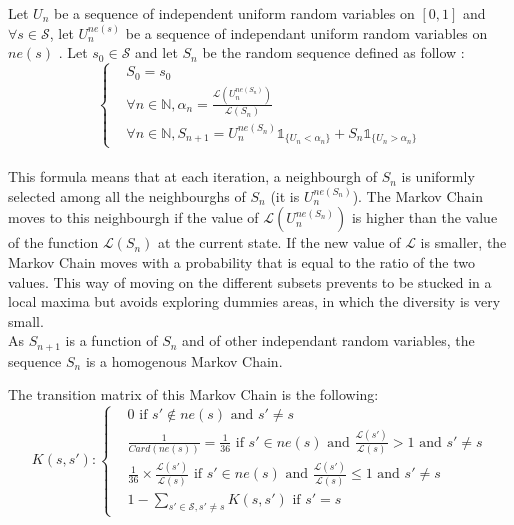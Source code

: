 Let $U_n$ be a sequence of independent uniform random variables on $[0, 1]$ and $\forall s \in \mathcal{S}$, let $U_{n}^{ne(s)}$ be a sequence of independant uniform random variables on $ne(s)$ .
Let $s_0 \in \mathcal{S}$ and let  $S_n$ be the random sequence defined as follow : \\


\[
 \left\{
    \begin{aligned}
        & S_0 = s_0 \\
        & \forall n \in \mathbb{N}, \alpha_n = \frac{\mathcal{L}(U_{n}^{ne(S_n)})}{\mathcal{L}(S_n)} \\
        & \forall n \in \mathbb{N}, S_{n+1} = U_{n}^{ne(S_n)} \mathbb{1}_{\{U_n < \alpha_n\}} + S_n \mathbb{1}_{\{U_n > \alpha_n\}}
\end{aligned}
\right.
\]
\\[0.5cm]

This formula means that at each iteration, a neighbourgh of $S_n$ is uniformly selected among all the neighbourghs of $S_n$ (it is $U_n^{ne(S_n)}$). 
The Markov Chain moves to this neighbourgh if the value of  $\mathcal{L}(U_n^{ne(S_n)})$ is higher than the value of the function $\mathcal{L}(S_n)$ at the current state.
If the new value of $\mathcal{L}$ is smaller, the Markov Chain moves with a probability that is equal to the ratio of the two values.
This way of moving on the different subsets prevents to be stucked in a local maxima but avoids exploring dummies areas, in which the diversity is very small. \\
As $S_{n+1}$ is a function of $S_n$ and of other independant random variables, the sequence $S_n$ is a homogenous Markov Chain.

The transition matrix of this Markov Chain is the following: 
\[
K(s, s'): \left\{
\begin{aligned}
& 0 \text{ if } s' \notin ne(s) \text{ and } s' \neq s   \\
& \frac{1}{Card(ne(s))} = \frac{1}{36} \text{ if } s' \in ne(s) \text{ and } \frac{\mathcal{L}(s')}{\mathcal{L}(s)} > 1 \text{ and } s' \neq s \\
& \frac{1}{36} \times \frac{\mathcal{L}(s')}{\mathcal{L}(s)} \text{ if } s' \in ne(s) \text{ and } \frac{\mathcal{L}(s')}{\mathcal{L}(s)} \leq 1  \text{ and } s' \neq s  \\
& 1 - \sum_{s' \in \mathcal{S}, s' \neq s}K(s, s') \text{ if } s' = s 
\end{aligned}
\right.
\]
\\[0.3cm]

